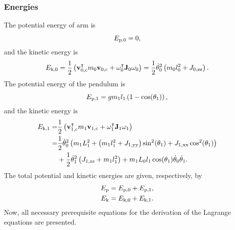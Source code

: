 \subsubsection{Energies}
The potential energy of arm is
\begin{equation}
	E _{\text{p,0}} = 0,
\end{equation}
and the kinetic energy is
\begin{equation}
	E _{\text{k,0}} = \frac{1}{2}\left( \text{\textbf{v}}_{0,\text{c}}^\intercal m_0\textbf{v}_{0,\text{c}} + \omega_0^\intercal \text{\textbf{J}}_0\omega_0  \right) = 
	\frac{1}{2}\dot{\theta}_0^2\left(  m_0l_0^2+J_{0,\text{zz}}  \right).
\end{equation}
The potential energy of the pendulum is
\begin{equation}
E _{\text{p,1}} = gm_1l_1\left( 1-\cos(\theta_1) \right),
\end{equation}
and the kinetic energy is
\begin{equation}
\begin{split}
	E _{\text{k,1}} = &\frac{1}{2}\left( \text{\textbf{v}}_{1,\text{c}}^\intercal m_1\textbf{v}_{1,\text{c}} + \omega_1^\intercal \text{\textbf{J}}_1\omega_1  \right)\\
	= &\frac{1}{2}\dot{\theta}_0^2\left( m_1L_1^2+\left( m_1l_1^2+J_{1,\text{yy}} \right)\sin^2(\theta_1)+J_{1,\text{xx}}\cos^2(\theta_1) \right)\\
	&+\frac{1}{2}\dot{\theta}_1^2\left(  J_{1,\text{zz}}+m_1l_1^2  \right)+m_1L_0l_1\cos(\theta_1)\dot{\theta}_0\dot{\theta}_1.
\end{split}
\end{equation}
The total potential and kinetic energies are given, respectively, by
\begin{subequations}
	\begin{align}
		E _{\text{p}} &= E _{\text{p,0}} + E _{\text{p,1}}, \\
		E _{\text{k}} &= E _{\text{k,0}} + E _{\text{k,1}}.
	\end{align}
\end{subequations}
Now, all necessary prerequisite equations for the derivation of the Lagrange equations are presented.
